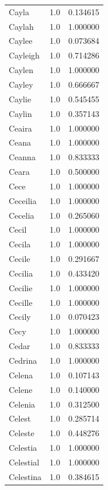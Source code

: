 \documentclass[
  letterpaper,
  DIV=11,
  numbers=noendperiod]{scrreprt}
\begin{document}
\begin{tabular}{lrr}
Cayla           &   1.0 &   0.134615 \\
Caylah          &   1.0 &   1.000000 \\
Caylee          &   1.0 &   0.073684 \\
Cayleigh        &   1.0 &   0.714286 \\
Caylen          &   1.0 &   1.000000 \\
Cayley          &   1.0 &   0.666667 \\
Caylie          &   1.0 &   0.545455 \\
Caylin          &   1.0 &   0.357143 \\
Ceaira          &   1.0 &   1.000000 \\
Ceana           &   1.0 &   1.000000 \\
Ceanna          &   1.0 &   0.833333 \\
Ceara           &   1.0 &   0.500000 \\
Cece            &   1.0 &   1.000000 \\
Ceceilia        &   1.0 &   1.000000 \\
Cecelia         &   1.0 &   0.265060 \\
Cecil           &   1.0 &   1.000000 \\
Cecila          &   1.0 &   1.000000 \\
Cecile          &   1.0 &   0.291667 \\
Cecilia         &   1.0 &   0.433420 \\
Cecilie         &   1.0 &   1.000000 \\
Cecille         &   1.0 &   1.000000 \\
Cecily          &   1.0 &   0.070423 \\
Cecy            &   1.0 &   1.000000 \\
Cedar           &   1.0 &   0.833333 \\
Cedrina         &   1.0 &   1.000000 \\
Celena          &   1.0 &   0.107143 \\
Celene          &   1.0 &   0.140000 \\
Celenia         &   1.0 &   0.312500 \\
Celest          &   1.0 &   0.285714 \\
Celeste         &   1.0 &   0.448276 \\
Celestia        &   1.0 &   1.000000 \\
Celestial       &   1.0 &   1.000000 \\
Celestina       &   1.0 &   0.384615 \\

\end{tabular}
\end{document}
